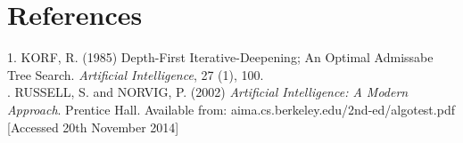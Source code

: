 \documentclass[a4paper,10pt]{article}
\begin{document}
\section{References}

1. KORF, R. (1985) Depth-First Iterative-Deepening; An Optimal Admissabe Tree Search. \emph{Artificial Intelligence}, 27 (1), 100. \\

. RUSSELL, S. and NORVIG, P. (2002) \emph{Artificial Intelligence: A Modern Approach}. Prentice Hall. Available from: aima.cs.berkeley.edu/2nd-ed/algotest.pdf [Accessed 20th November 2014]
\end{document}
